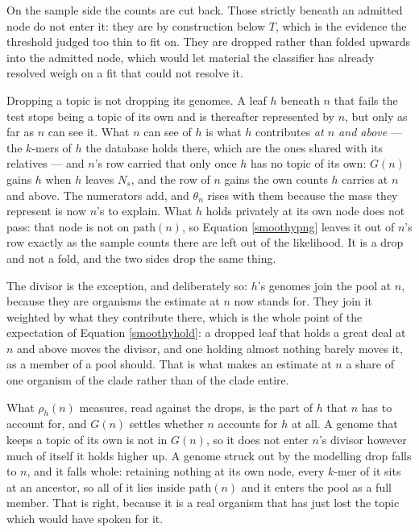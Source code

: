 \documentclass[pdflatex,sn-vancouver-num]{sn-jnl}
\begin{document}
    On the sample side the counts are cut back. Those strictly beneath an admitted node do not enter
    it: they are by construction below $T$, which is the evidence the threshold judged too thin to
    fit on. They are dropped rather than folded upwards into the admitted node, which would let
    material the classifier has already resolved weigh on a fit that could not resolve it.

    Dropping a topic is not dropping its genomes. A leaf $h$ beneath $n$ that fails the test stops
    being a topic of its own and is thereafter represented by $n$, but only as far as $n$ can see it.
    What $n$ can see of $h$ is what $h$ contributes \emph{at $n$ and above} --- the $k$-mers of $h$
    the database holds there, which are the ones shared with its relatives --- and $n$'s row carried
    that only once $h$ has no topic of its own: $G(n)$ gains $h$ when $h$ leaves $N_s$, and the row of
    $n$ gains the own counts $h$ carries at $n$ and above. The numerators add, and $\theta_n$ rises
    with them because the mass they represent is now $n$'s to explain. What $h$ holds privately at
    its own node does not pass: that node is not on $\mathrm{path}(n)$, so Equation \eqref{smoothypng}
    leaves it out of $n$'s row exactly as the sample counts there are left out of the likelihood.
    It is a drop and not a fold, and the two sides drop the same thing.

    The divisor is the exception, and deliberately so: $h$'s genomes join the pool at $n$, because
    they are organisms the estimate at $n$ now stands for. They join it weighted by what they
    contribute there, which is the whole point of the expectation of
    Equation \eqref{smoothyhold}: a dropped leaf that holds a great deal at $n$ and above moves the
    divisor, and one holding almost nothing barely moves it, as a member of a pool should. That
    is what makes an estimate at $n$ a share of one organism of the clade rather than of the clade
    entire.

    What $\rho_h(n)$ measures, read against the drops, is the part of $h$ that $n$ has to account for,
    and $G(n)$ settles whether $n$ accounts for $h$ at all. A genome that keeps a topic of its own is
    not in $G(n)$, so it does not enter $n$'s divisor however much of itself it holds higher up. A
    genome struck out by the modelling drop falls to $n$, and it falls whole: retaining nothing at
    its own node, every $k$-mer of it sits at an ancestor, so all of it lies inside
    $\mathrm{path}(n)$ and it enters the pool as a full member. That is right, because it is a real
    organism that has just lost the topic which would have spoken for it.
\end{document}
